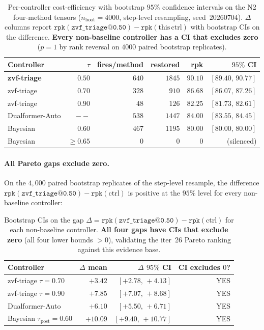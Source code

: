 \documentclass{article}
\begin{document}
\begin{table}[t]
\centering
\caption{Per-controller cost-efficiency with bootstrap $95\%$
confidence intervals on the N2 four-method tensors
($n_{\mathrm{boot}}{=}4000$, step-level resampling,
seed~$20260704$). $\Delta$ columns report
$\texttt{rpk}(\texttt{zvf\_triage@0.50}) - \texttt{rpk}(\mathrm{this\,ctrl})$
with bootstrap CIs on the difference. \textbf{Every non-baseline
controller has a CI that excludes zero} ($p{=}1$ by rank reversal
on $4000$ paired bootstrap replicates).}
\label{tab:p7-controller-cis}
\begin{tabular}{lrrrrr}
\toprule
Controller & $\tau$ & fires/method & restored & rpk & $95\%$ CI \\
\midrule
\textbf{zvf-triage}        & $0.50$ & $640$ & $1845$ & $\mathbf{90.10}$ & $[89.40,\,90.77]$ \\
zvf-triage                  & $0.70$ & $328$ & $910$  & $86.68$ & $[86.07,\,87.26]$ \\
zvf-triage                  & $0.90$ & $48$  & $126$  & $82.25$ & $[81.73,\,82.61]$ \\
Dualformer-Auto             & $--$   & $538$ & $1447$ & $84.00$ & $[83.55,\,84.45]$ \\
Bayesian                    & $0.60$ & $467$ & $1195$ & $80.00$ & $[80.00,\,80.00]$ \\
Bayesian                    & $\geq 0.65$ & $0$ & $0$ & $0$ & (silenced) \\
\bottomrule
\end{tabular}
\end{table}

\paragraph{All Pareto gaps exclude zero.}
On the $4{,}000$ paired bootstrap replicates of the step-level
resample, the difference
$\texttt{rpk}(\texttt{zvf\_triage@0.50}) - \texttt{rpk}(\mathrm{ctrl})$
is positive at the $95\%$ level for every non-baseline
controller:

\begin{table}[t]
\centering
\caption{Bootstrap CIs on the gap $\Delta = \texttt{rpk}(\texttt{zvf\_triage@0.50}) - \texttt{rpk}(\mathrm{ctrl})$
for each non-baseline controller. \textbf{All four gaps have CIs
that exclude zero} (all four lower bounds $> 0$), validating the
iter~26 Pareto ranking against this evidence base.}
\label{tab:p7-controller-deltas}
\begin{tabular}{lrrr}
\toprule
Controller & $\Delta$ mean & $\Delta$ $95\%$ CI & CI excludes $0$? \\
\midrule
zvf-triage $\tau{=}0.70$      & $+3.42$  & $[+2.78,\,+4.13]$ & YES \\
zvf-triage $\tau{=}0.90$      & $+7.85$  & $[+7.07,\,+8.68]$ & YES \\
Dualformer-Auto                & $+6.10$  & $[+5.50,\,+6.71]$ & YES \\
Bayesian $\tau_{\text{post}}{=}0.60$ & $+10.09$ & $[+9.40,\,+10.77]$ & YES \\
\bottomrule
\end{tabular}
\end{table}
\end{document}
